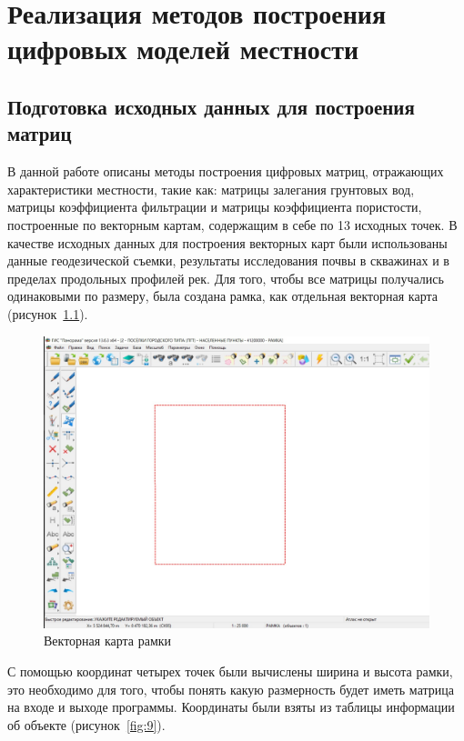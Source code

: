 \chapter{Реализация методов построения цифровых моделей местности}

\section{Подготовка исходных данных для построения матриц }

В данной работе описаны методы построения цифровых матриц, отражающих характеристики местности, такие как: матрицы залегания грунтовых вод, матрицы коэффициента фильтрации и матрицы коэффициента пористости, построенные по векторным картам, содержащим в себе по 13 исходных точек. В качестве исходных данных для построения векторных карт были использованы данные геодезической съемки, результаты исследования почвы в скважинах и в пределах продольных профилей рек. Для того, чтобы все матрицы получались одинаковыми по размеру, была создана рамка, как отдельная векторная карта (рисунок~\ref{fig:8}).

\begin{figure}[h!]
    \center
    \includegraphics[scale=0.5]{images/1111.jpg}
    \caption{Векторная карта рамки}
    \label{fig:8}
\end{figure}


С помощью координат четырех точек были вычислены ширина и высота рамки, это необходимо для того, чтобы понять какую размерность будет иметь матрица на входе и выходе программы. Координаты были взяты из таблицы информации об объекте (рисунок~\ref{fig:9}).

